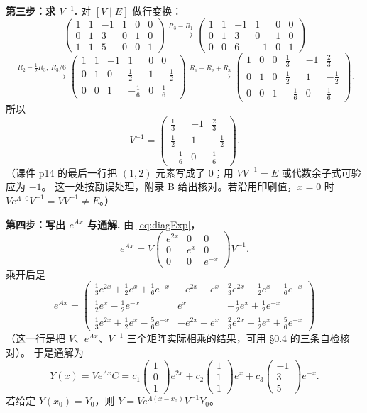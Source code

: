 \documentclass[11pt]{ctexart}
\newcommand{\pmat}[1]{\begin{pmatrix}#1\end{pmatrix}}
\begin{document}
\textbf{第三步：求 $V^{-1}$.} 对 $[V\mid E]$ 做行变换：
\[
\left(\begin{array}{ccc|ccc}
1&1&-1&1&0&0\\
0&1&3&0&1&0\\
1&1&5&0&0&1
\end{array}\right)
\xrightarrow{R_3-R_1}
\left(\begin{array}{ccc|ccc}
1&1&-1&1&0&0\\
0&1&3&0&1&0\\
0&0&6&-1&0&1
\end{array}\right)
\]
\[
\xrightarrow{R_2-\frac12R_3,\ R_3/6}
\left(\begin{array}{ccc|ccc}
1&1&-1&1&0&0\\
0&1&0&\frac12&1&-\frac12\\
0&0&1&-\frac16&0&\frac16
\end{array}\right)
\xrightarrow{R_1-R_2+R_3}
\left(\begin{array}{ccc|ccc}
1&0&0&\frac13&-1&\frac23\\
0&1&0&\frac12&1&-\frac12\\
0&0&1&-\frac16&0&\frac16
\end{array}\right).
\]
所以
\[
V^{-1}=\pmat{\frac13&-1&\frac23\\[2pt]\frac12&1&-\frac12\\[2pt]-\frac16&0&\frac16}.
\]
（课件 p14 的最后一行把 $(1,2)$ 元素写成了 $0$；用 $VV^{-1}=E$ 或代数余子式可验应为 $-1$。
这一处按勘误处理，附录 B 给出核对。若沿用印刷值，$x=0$ 时 $Ve^{\Lambda\cdot0}V^{-1}=VV^{-1}\ne E$。）

\textbf{第四步：写出 $e^{Ax}$ 与通解.} 由 \eqref{eq:diagExp}，
\[
e^{Ax}=V\pmat{e^{2x}&0&0\\0&e^{x}&0\\0&0&e^{-x}}V^{-1}.
\]
乘开后是
\[
e^{Ax}=
\pmat{
\frac13e^{2x}+\frac12e^{x}+\frac16e^{-x} &
-e^{2x}+e^{x} &
\frac23e^{2x}-\frac12e^{x}-\frac16e^{-x}\\[4pt]
\frac12e^{x}-\frac12e^{-x} & e^{x} & -\frac12e^{x}+\frac12e^{-x}\\[4pt]
\frac13e^{2x}+\frac12e^{x}-\frac56e^{-x} &
-e^{2x}+e^{x} &
\frac23e^{2x}-\frac12e^{x}+\frac56e^{-x}}
\]
（这一行是把 $V$、$e^{\Lambda x}$、$V^{-1}$ 三个矩阵实际相乘的结果，可用 §0.4 的三条自检核对）。
于是通解为
\[
Y(x)=Ve^{\Lambda x}C
=c_1\pmat{1\\0\\1}e^{2x}+c_2\pmat{1\\1\\1}e^{x}+c_3\pmat{-1\\3\\5}e^{-x}.
\]
若给定 $Y(x_0)=Y_0$，则 $Y=Ve^{\Lambda(x-x_0)}V^{-1}Y_0$。
\end{document}
